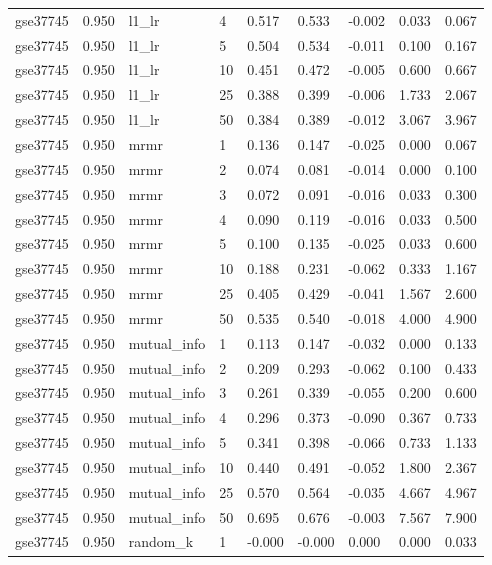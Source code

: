 \begin{table}[t]
\begin{tabular}{lllllllll}
    gse37745 & 0.950 & l1\_lr & 4 & 0.517 & 0.533 & -0.002 & 0.033 & 0.067 \\
    gse37745 & 0.950 & l1\_lr & 5 & 0.504 & 0.534 & -0.011 & 0.100 & 0.167 \\
    gse37745 & 0.950 & l1\_lr & 10 & 0.451 & 0.472 & -0.005 & 0.600 & 0.667 \\
    gse37745 & 0.950 & l1\_lr & 25 & 0.388 & 0.399 & -0.006 & 1.733 & 2.067 \\
    gse37745 & 0.950 & l1\_lr & 50 & 0.384 & 0.389 & -0.012 & 3.067 & 3.967 \\
    gse37745 & 0.950 & mrmr & 1 & 0.136 & 0.147 & -0.025 & 0.000 & 0.067 \\
    gse37745 & 0.950 & mrmr & 2 & 0.074 & 0.081 & -0.014 & 0.000 & 0.100 \\
    gse37745 & 0.950 & mrmr & 3 & 0.072 & 0.091 & -0.016 & 0.033 & 0.300 \\
    gse37745 & 0.950 & mrmr & 4 & 0.090 & 0.119 & -0.016 & 0.033 & 0.500 \\
    gse37745 & 0.950 & mrmr & 5 & 0.100 & 0.135 & -0.025 & 0.033 & 0.600 \\
    gse37745 & 0.950 & mrmr & 10 & 0.188 & 0.231 & -0.062 & 0.333 & 1.167 \\
    gse37745 & 0.950 & mrmr & 25 & 0.405 & 0.429 & -0.041 & 1.567 & 2.600 \\
    gse37745 & 0.950 & mrmr & 50 & 0.535 & 0.540 & -0.018 & 4.000 & 4.900 \\
    gse37745 & 0.950 & mutual\_info & 1 & 0.113 & 0.147 & -0.032 & 0.000 & 0.133 \\
    gse37745 & 0.950 & mutual\_info & 2 & 0.209 & 0.293 & -0.062 & 0.100 & 0.433 \\
    gse37745 & 0.950 & mutual\_info & 3 & 0.261 & 0.339 & -0.055 & 0.200 & 0.600 \\
    gse37745 & 0.950 & mutual\_info & 4 & 0.296 & 0.373 & -0.090 & 0.367 & 0.733 \\
    gse37745 & 0.950 & mutual\_info & 5 & 0.341 & 0.398 & -0.066 & 0.733 & 1.133 \\
    gse37745 & 0.950 & mutual\_info & 10 & 0.440 & 0.491 & -0.052 & 1.800 & 2.367 \\
    gse37745 & 0.950 & mutual\_info & 25 & 0.570 & 0.564 & -0.035 & 4.667 & 4.967 \\
    gse37745 & 0.950 & mutual\_info & 50 & 0.695 & 0.676 & -0.003 & 7.567 & 7.900 \\
    gse37745 & 0.950 & random\_k & 1 & -0.000 & -0.000 & 0.000 & 0.000 & 0.033 \\

\end{tabular}
\end{table}
